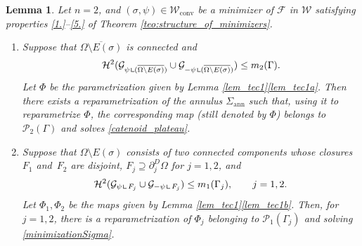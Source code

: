 \documentclass[11pt]{article}
\numberwithin{equation}{section}
\let\Om\Omega
\newcommand\admclassconv{{\mathcal W_\mathrm{conv}}}
\newcommand{\openannulus}{\Sigma_\mathrm{ann}}
\newcommand{\resa}{\mathop{\hbox{\vrule height 7pt width 0.5pt depth 0pt
\vrule height 0.5pt width 6pt depth 0pt}}\nolimits}
\newcommand{\resb}{\mathop{\hbox{\vrule height 4pt width 0.5pt depth 0pt
\vrule height 0.5pt width 3pt depth 0pt}}\nolimits}
\newcommand{\res}{\mathchoice{\resa}{\resa}{\resb}{\resb}}
\newtheorem{lemma}[theorem]{Lemma}
\theoremstyle{definition}
\begin{document}
\begin{lemma}\label{lem_tec2}
Let $n=2$, and $(\sigma,\psi)\in\admclassconv$ be a minimizer of
$\mathcal F$ in
$\mathcal W$
satisfying properties \ref{1.}--\ref{5.} of Theorem \ref{teo:structure_of_minimizers}.
\begin{enumerate}[{\rm(a)},wide]
\item\label{lem_tec2a}
Suppose that $\overline{\Om\setminus E(\sigma)}$ is connected and
\begin{equation}\label{eq:lem_tec2}
\mathcal H^2(\mathcal G_{\psi\res (\overline{\Om\setminus E(\sigma)})}\cup\mathcal G_{-\psi\res (\overline{\Om\setminus E(\sigma)})})\leq m_2(\Gamma).
\end{equation}
Let $\Phi$ be the parametrization given by Lemma \ref{lem_tec1}\ref{lem_tec1a}.
Then there exists a reparametrization of the annulus $\openannulus$
such that, using it to reparametrize $\Phi$, the corresponding map (still denoted by $\Phi$)
belongs to $\mathcal P_2(\Gamma)$ and solves \eqref{catenoid_plateau}.
\item\label{lem_tec2b}
Suppose that $\Om\setminus E(\sigma)$
consists of two connected components whose closures~$F_1$ and~$F_2$ are disjoint,
$F_j \supseteq \partial_j^D \Om$ for $j=1,2$, and
\[
\mathcal H^2(\mathcal G_{\psi\res {F_j}}
\cup\mathcal G_{-\psi\res {F_j}})\leq m_1(\Gamma_j),
\qquad j=1,2.
\]
Let $\Phi_1,\Phi_2$ be the maps given by Lemma \ref{lem_tec1}\ref{lem_tec1b}. Then, for $j=1,2$, there is a reparametrization
of $\Phi_j$ belonging to $\mathcal P_1(\Gamma_j)$ and solving \eqref{minimizationSigma}.
\end{enumerate}
\end{lemma}
\end{document}
